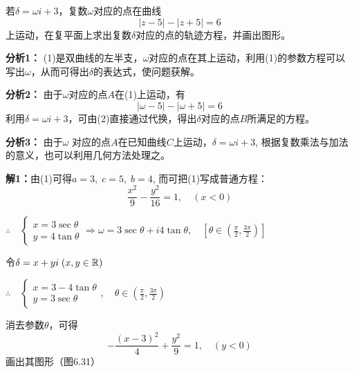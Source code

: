 \begin{example}
    若$\delta =\omega i+3$，复数$\omega$对应的点在曲线
\begin{equation}
    |z-5|-|z+5|=6 \tag{1}
\end{equation}
上运动，在复平面上求出复数$\delta$对应的点的轨迹方程，并画出图形。
\end{example}

\textbf{分析1：}
(1)是双曲线的左半支，$\omega$对应的点在其上运动，利用(1)的参数方程可以写出$\omega$，从而可得出$\delta$的表达式，使问题获解。

\textbf{分析2：}  由于$\omega$对应的点$A$在(1)上运动，有
\begin{equation}
    |\omega -5|-|\omega+5|=6\tag{2}
\end{equation}
利用$\delta=\omega i+3$，可由(2)直接通过代换，得出$\delta$对应的点$B$所满足的方程。

\textbf{分析3：}
由于$\omega$ 对应的点$A$在已知曲线$C$上运动，$\delta =\omega i+3$, 根据复数乘法与加法的意义，也可以利用几何方法处理之。



   \textbf{解1：}由(1)可得$a=3,\; c=5,\; b=4$, 而可把(1)写成普通方程： 
\[\frac{x^2}{9}-\frac{y^2}{16}=1,\quad (x<0)\]

$\therefore\quad \begin{cases}
    x=3\sec\theta \\ y=4\tan\theta
\end{cases} \Rightarrow \omega =3\sec\theta+i4\tan\theta,\quad \left[\theta\in\left(\frac{\pi}{2},\frac{3\pi}{2}\right)\right]$

令$\delta=x+yi\; (x,y\in\mathbb{R})$

$\therefore\quad \begin{cases}
    x=3-4\tan\theta  \\ y=3\sec\theta 
\end{cases},\quad \theta\in\left(\frac{\pi}{2},\frac{3\pi}{2}\right)$

消去参数$\theta$，可得
\[-\frac{(x-3)^2}{4}+\frac{y^2}{9}=1,\quad (y<0)\]
画出其图形（图6.31）

